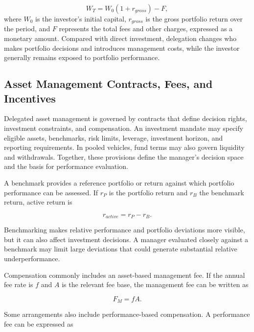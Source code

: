 \begin{equation}
W_T=W_0(1+r_{gross})-F,
\label{eq:ch14-investor-terminal-wealth}
\end{equation}
where $W_0$ is the investor's initial capital, $r_{gross}$ is the
gross portfolio return over the period, and $F$ represents
the total fees and other charges, expressed as a monetary
amount. Compared with direct investment, delegation changes who makes portfolio decisions and introduces management costs, while the investor generally remains exposed to portfolio performance.

\subsection{Asset Management Contracts, Fees, and Incentives}

Delegated asset management is governed by contracts that define decision rights, investment constraints, and compensation. An investment mandate may specify eligible assets, benchmarks, risk limits, leverage, investment horizon, and reporting requirements. In pooled vehicles, fund terms may also govern liquidity and withdrawals. Together, these provisions define the manager's decision space and the basis for performance evaluation.

A benchmark provides a reference portfolio or return against which portfolio performance can be assessed. If $r_P$ is the portfolio return and $r_B$ the benchmark return, active return is

\begin{equation}
r_{active}=r_P-r_B.
\label{eq:ch14-active-return}
\end{equation}

Benchmarking makes relative performance and portfolio deviations more visible, but it can also affect investment decisions. A manager evaluated closely against a benchmark may limit large deviations that could generate substantial relative underperformance.

Compensation commonly includes an asset-based management fee. If the annual fee rate is $f$ and $A$ is the relevant fee base, the management fee can be written as

\begin{equation}
F_M=fA.
\label{eq:ch14-management-fee}
\end{equation}

Some arrangements also include performance-based compensation. A performance fee can be expressed as

